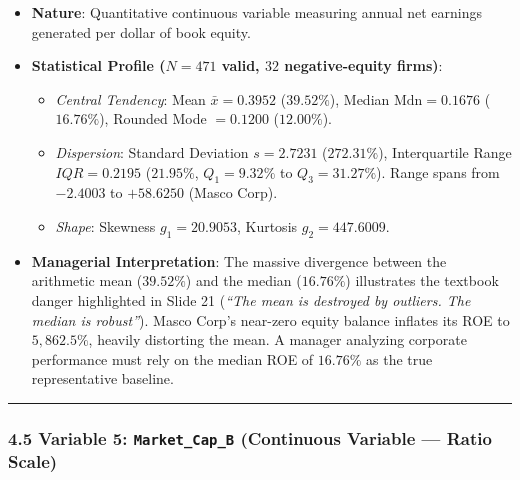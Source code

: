 \documentclass[
]{article}
\providecommand{\tightlist}{%
  \setlength{\itemsep}{0pt}\setlength{\parskip}{0pt}}
\begin{document}
\begin{itemize}
\tightlist
\item
  \textbf{Nature}: Quantitative continuous variable measuring annual net
  earnings generated per dollar of book equity.
\item
  \textbf{Statistical Profile (\(N = 471\) valid, \(32\) negative-equity
  firms)}:

  \begin{itemize}
  \tightlist
  \item
    \emph{Central Tendency}: Mean \(\bar{x} = 0.3952\) (\(39.52\%\)),
    Median \(\text{Mdn} = 0.1676\) (\(16.76\%\)), Rounded Mode
    \(= 0.1200\) (\(12.00\%\)).
  \item
    \emph{Dispersion}: Standard Deviation \(s = 2.7231\) (\(272.31\%\)),
    Interquartile Range \(IQR = 0.2195\) (\(21.95\%\), \(Q_1 = 9.32\%\)
    to \(Q_3 = 31.27\%\)). Range spans from \(-2.4003\) to \(+58.6250\)
    (Masco Corp).
  \item
    \emph{Shape}: Skewness \(g_1 = 20.9053\), Kurtosis
    \(g_2 = 447.6009\).
  \end{itemize}
\item
  \textbf{Managerial Interpretation}: The massive divergence between the
  arithmetic mean (\(39.52\%\)) and the median (\(16.76\%\)) illustrates
  the textbook danger highlighted in Slide 21 (\emph{``The mean is
  destroyed by outliers. The median is robust''}). Masco Corp's
  near-zero equity balance inflates its ROE to \(5,862.5\%\), heavily
  distorting the mean. A manager analyzing corporate performance must
  rely on the median ROE of \(16.76\%\) as the true representative
  baseline.
\end{itemize}

\begin{center}\rule{0.5\linewidth}{0.5pt}\end{center}

\subsubsection{\texorpdfstring{4.5 Variable 5: \texttt{Market\_Cap\_B}
(Continuous Variable --- Ratio
Scale)}{4.5 Variable 5: Market\_Cap\_B (Continuous Variable --- Ratio Scale)}}\label{variable-5-market_cap_b-continuous-variable-ratio-scale}
\end{document}
